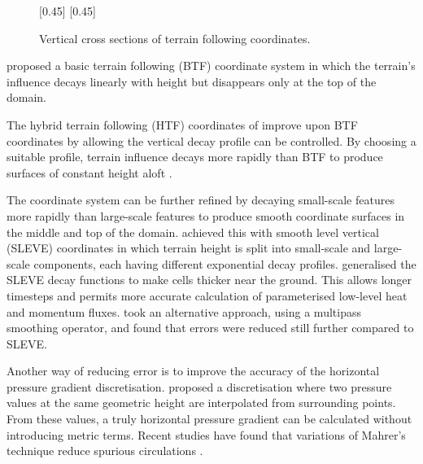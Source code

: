 \begin{figure}
	\captionsetup[subfigure]{position=b}
	\centering
	[0.45\textwidth]{}
	\hfill
	[0.45\textwidth]{}
	\caption{Vertical cross sections of terrain following coordinates.    }
	\label{fig:intro:tf}
\end{figure}

\textcite{galchen-somerville1975} proposed a basic terrain following (BTF) coordinate system in which the terrain's influence decays linearly with height but disappears only at the top of the domain.

The hybrid terrain following (HTF) coordinates of \textcite{simmons-burridge1981} improve upon BTF coordinates by allowing the vertical decay profile can be controlled.  By choosing a suitable profile, terrain influence decays more rapidly than BTF to produce surfaces of constant height aloft \autocite{klemp2011}.

The coordinate system can be further refined by decaying small-scale features more rapidly than large-scale features to produce smooth coordinate surfaces in the middle and top of the domain.  \textcite{schaer2002} achieved this with smooth level vertical (SLEVE) coordinates in which terrain height is split into small-scale and large-scale components, each having different exponential decay profiles.
\textcite{leuenberger2010} generalised the SLEVE decay functions to make cells thicker near the ground.  This allows longer timesteps and permits more accurate calculation of parameterised low-level heat and momentum fluxes.
\textcite{klemp2011} took an alternative approach, using a multipass smoothing operator, and found that errors were reduced still further compared to SLEVE.


Another way of reducing error is to improve the accuracy of the horizontal pressure gradient discretisation.  \textcite{mahrer1984} proposed a discretisation where two pressure values at the same geometric height are interpolated from surrounding points.  From these values, a truly horizontal pressure gradient can be calculated without introducing metric terms.  Recent studies have found that variations of Mahrer's technique reduce spurious circulations \parencites{dempsey-davis1998}{klemp2011}{zaengl2012}.

